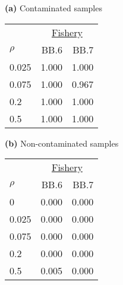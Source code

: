 {\bf (a)} Contaminated samples 
\begin{center}
\begin{tabular}{lrr} 
  &  \multicolumn{2}{c}{\underline{Fishery}} \\
$\rho~~~~~~~$  &  BB.6            &  BB.7            \\  
\hline 0.025   &  1.000           &  1.000           \\  
0.075           &  1.000           &  0.967           \\  
0.2             &  1.000           &  1.000           \\  
0.5             &  1.000           &  1.000           \\  
\end{tabular} 
\end{center}
{\bf (b)} Non-contaminated samples 
\begin{center}
\begin{tabular}{lrr} 
  &  \multicolumn{2}{c}{\underline{Fishery}} \\
$\rho~~~~~~~$  &  BB.6            &  BB.7            \\  
\hline 0       &  0.000           &  0.000           \\  
0.025           &  0.000           &  0.000           \\  
0.075           &  0.000           &  0.000           \\  
0.2             &  0.000           &  0.000           \\  
0.5             &  0.005           &  0.000           \\  
\end{tabular} 
\end{center}
